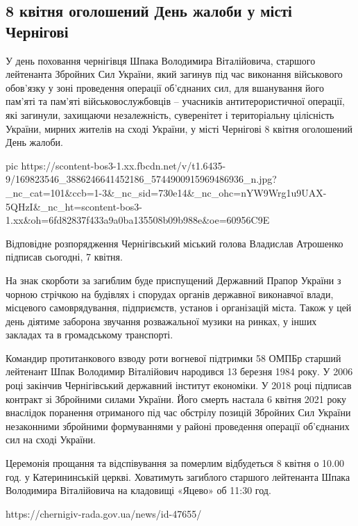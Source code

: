  
 
 
 
 

\subsection{8 квітня оголошений День жалоби у місті Чернігові}
\label{sec:07_04_2021.fb.chernigiv_voen_kom.1.traur}

У день поховання чернігівця Шпака Володимира Віталійовича, старшого лейтенанта
Збройних Сил України, який загинув під час виконання військового обов’язку у
зоні проведення операції об’єднаних сил, для вшанування його пам'яті та пам’яті
військовослужбовців – учасників антитерористичної операції, які загинули,
захищаючи незалежність, суверенітет і територіальну цілісність України, мирних
жителів на сході України, у місті Чернігові 8 квітня оголошений День жалоби.

\ifcmt
  pic https://scontent-bos3-1.xx.fbcdn.net/v/t1.6435-9/169823546_3886246641452186_5744900915969486936_n.jpg?_nc_cat=101&ccb=1-3&_nc_sid=730e14&_nc_ohc=nYW9Wrg1u9UAX-5QHzI&_nc_ht=scontent-bos3-1.xx&oh=6fd82837f433a9a0ba135508b09b988e&oe=60956C9E
\fi

Відповідне розпорядження Чернігівський міський голова Владислав Атрошенко
підписав сьогодні, 7 квітня.

На знак скорботи за загиблим буде приспущений Державний Прапор України з чорною
стрічкою на будівлях і спорудах органів державної виконавчої влади, місцевого
самоврядування, підприємств, установ і організацій міста. Також у цей день
діятиме заборона звучання розважальної музики на ринках, у інших закладах та в
громадському транспорті.

Командир протитанкового взводу роти вогневої підтримки 58 ОМПБр старший
лейтенант Шпак Володимир Віталійович народився 13 березня 1984 року. У 2006
році закінчив Чернігівський державний інститут економіки. У 2018 році підписав
контракт зі Збройними силами України. Його смерть настала 6 квітня 2021 року
внаслідок поранення отриманого під час обстрілу позицій Збройних Сил України
незаконними збройними формуваннями у районі проведення операції об'єднаних сил
на сході України.

Церемонія прощання та відспівування за померлим відбудеться 8 квітня о 10.00
год. у Катерининській церкві. Ховатимуть загиблого старшого лейтенанта Шпака
Володимира Віталійовича на кладовищі «Яцево» об 11:30 год.

https://chernigiv-rada.gov.ua/news/id-47655/
